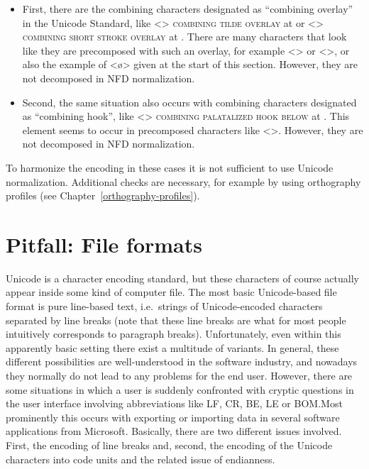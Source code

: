 \begin{itemize}
  
  \item First, there are the combining characters designated as ``combining
        overlay'' in the Unicode Standard, like <>
        \textsc{combining tilde overlay} at  or <>
        \textsc{combining short stroke overlay} at . There are many
        characters that look like they are precomposed with such an overlay,
        for example <> or <>, or also the
        example of <ø> given at the start of this section. However, they are 
        not decomposed in NFD normalization.
  \item Second, the same situation also occurs with combining characters
        designated as ``combining hook'', like 
        <{}> \textsc{combining
        palatalized hook below} at . This element seems to occur in
        precomposed characters like <>. However, they are 
        not decomposed in NFD normalization.
        
\end{itemize}

To harmonize the encoding in these cases it is not sufficient to use Unicode 
normalization. Additional checks are necessary, for example by using orthography 
profiles (see Chapter~\ref{orthography-profiles}).

\section{Pitfall: File formats}
\label{pitfall-file-formats}

Unicode is a character encoding standard, but these characters of course
actually appear inside some kind of computer file. The most basic Unicode-based file
format is pure line-based text, i.e.~strings of Unicode-encoded characters
separated by line breaks (note that these line breaks are what for most people
intuitively corresponds to paragraph breaks). Unfortunately, even within this
apparently basic setting there exist a multitude of variants. In general, these
different possibilities are well-understood in the software industry, and
nowadays they normally do not lead to any problems for the end user. However,
there are some situations in which a user is suddenly confronted with cryptic
questions in the user interface involving abbreviations like LF, CR, BE, LE or
BOM.\@ Most prominently this occurs with exporting or importing data in several
software applications from Microsoft. Basically, there are two different issues
involved. First, the encoding of line breaks and, second, the encoding of the
Unicode characters into code units and the related issue of endianness.

